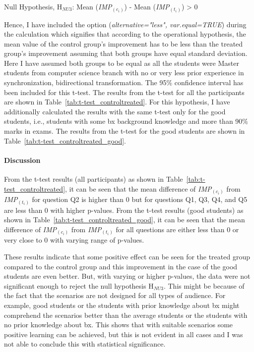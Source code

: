 Null Hypothesis, {H$_{NU3}$}: Mean (\textit{IMP$_{(c_i)}$}) - Mean (\textit{IMP$_{(t_i)}$}) > 0

Hence, I have included the option (\textit{alternative="less", var.equal=TRUE}) during the calculation which signifies that according to the operational hypothesis, the mean value of the control group's improvement has to be less than the treated group's improvement assuming that both groups have equal standard deviation. Here I have assumed both groups to be equal as all the students were Master students from computer science branch with no or very less prior experience in synchronization, bidirectional transformation. The 95\% confidence interval has been included for this t-test. The results from the t-test for all the participants are shown in Table~\ref{tab:t-test_controltreated}. For this hypothesis, I have additionally calculated the results with the same t-test only for the good students, i.e., students with some bx background knowledge and more than 90\% marks in exams. The results from the t-test for the good students are shown in Table~\ref{tab:t-test_controltreated_good}.

\paragraph{Discussion}
From the t-test results (all participants) as shown in Table~\ref{tab:t-test_controltreated}, it can be seen that the mean difference of \textit{IMP$_{(c_i)}$} from \textit{IMP$_{(t_i)}$} for question Q2 is higher than 0 but for questions Q1, Q3, Q4, and Q5 are less than 0 with higher p-values. From the t-test results (good students) as shown in Table~\ref{tab:t-test_controltreated_good}, it can be seen that the mean difference of \textit{IMP$_{(c_i)}$} from \textit{IMP$_{(t_i)}$} for all questions are either less than 0 or very close to 0 with varying range of p-values.

These results indicate that some positive effect can be seen for the treated group compared to the control group and this improvement in the case of the good students are even better. But, with varying or higher p-values, the data were not significant enough to reject the null hypothesis {H$_{NU3}$}. This might be because of the fact that the scenarios are not designed for all types of audience. For example, good students or the students with prior knowledge about bx might comprehend the scenarios better than the average students or the students with no prior knowledge about bx. This shows that with suitable scenarios some positive learning can be achieved, but this is not evident in all cases and I was not able to conclude this with statistical significance.

